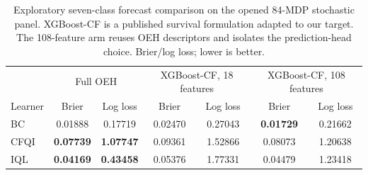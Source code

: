 \begin{table}[t]
\centering\small
\caption{Exploratory seven-class forecast comparison on the opened 84-MDP stochastic panel. XGBoost-CF is a published survival formulation adapted to our target. The 108-feature arm reuses OEH descriptors and isolates the prediction-head choice. Brier/log loss; lower is better.}
\label{tab:survival}
\begin{tabular}{lcccccc}
\toprule
& \multicolumn{2}{c}{Full OEH} & \multicolumn{2}{c}{XGBoost-CF, 18 features} & \multicolumn{2}{c}{XGBoost-CF, 108 features}\\
Learner & Brier & Log loss & Brier & Log loss & Brier & Log loss\\
\midrule
BC & 0.01888 & 0.17719 & 0.02470 & 0.27043 & \textbf{0.01729} & 0.21662\\
CFQI & \textbf{0.07739} & \textbf{1.07747} & 0.09361 & 1.52866 & 0.08073 & 1.20638\\
IQL & \textbf{0.04169} & \textbf{0.43458} & 0.05376 & 1.77331 & 0.04479 & 1.23418\\
\bottomrule
\end{tabular}
\end{table}
